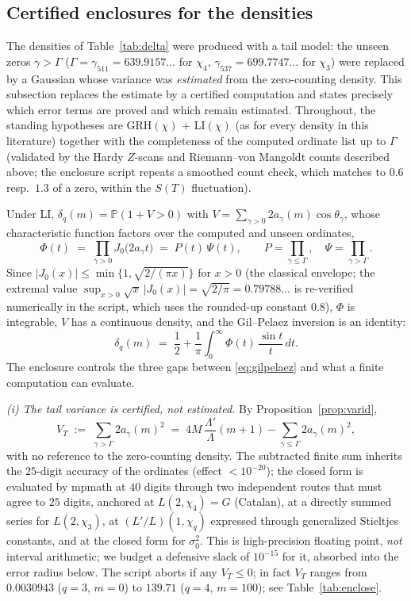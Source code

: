 \subsection*{Certified enclosures for the densities}
\label{subsec:certified}

The densities of Table~\ref{tab:delta} were produced with a tail model:
the unseen zeros $\gamma>\Gamma$ ($\Gamma=\gamma_{511}=639.9157\ldots$
for $\chi_4$, $\gamma_{537}=699.7747\ldots$ for $\chi_3$) were replaced
by a Gaussian whose variance was \emph{estimated} from the
zero-counting density. This subsection replaces the estimate by a
certified computation and states precisely which error terms are proved
and which remain estimated. Throughout, the standing hypotheses are
GRH$(\chi)$ + LI$(\chi)$ (as for every density in this literature)
together with the completeness of the computed ordinate list up to
$\Gamma$ (validated by the Hardy $Z$-scans and Riemann--von Mangoldt
counts described above; the enclosure script repeats a smoothed count
check, which matches to $0.6$ resp.\ $1.3$ of a zero, within the
$S(T)$ fluctuation).

Under LI, $\delta_q(m)=\mathbb P(1+V>0)$ with
$V=\sum_{\gamma>0}2a_\gamma(m)\cos\theta_\gamma$, whose characteristic
function factors over the computed and unseen ordinates,
\[
\Phi(t)\;=\;\prod_{\gamma>0}J_0\bigl(2a_\gamma t\bigr)
\;=\;P(t)\,\Psi(t),\qquad
P=\prod_{\gamma\le\Gamma},\quad \Psi=\prod_{\gamma>\Gamma}.
\]
Since $|J_0(x)|\le\min\{1,\sqrt{2/(\pi x)}\}$ for $x>0$ (the classical
envelope; the extremal value $\sup_{x>0}\sqrt x\,|J_0(x)|=\sqrt{2/\pi}
=0.79788\ldots$ is re-verified numerically in the script, which uses
the rounded-up constant $0.8$), $\Phi$ is integrable, $V$ has a
continuous density, and the Gil--Pelaez inversion is an identity:
\begin{equation}\label{eq:gilpelaez}
\delta_q(m)\;=\;\frac12+\frac1\pi\int_0^\infty
\Phi(t)\,\frac{\sin t}{t}\,dt .
\end{equation}
The enclosure controls the three gaps between \eqref{eq:gilpelaez} and
what a finite computation can evaluate.

\emph{(i) The tail variance is certified, not estimated.} By
Proposition~\ref{prop:varid},
\[
V_T\;:=\;\sum_{\gamma>\Gamma}2a_\gamma(m)^2
\;=\;4M\,\frac{\Lambda'}{\Lambda}(m+1)-\sum_{\gamma\le\Gamma}2a_\gamma(m)^2 ,
\]
with no reference to the zero-counting density. The subtracted finite
sum inherits the $25$-digit accuracy of the ordinates (effect
$<10^{-20}$); the closed form is evaluated by mpmath at $40$ digits
through two independent routes that must agree to $25$ digits, anchored
at $L(2,\chi_4)=G$ (Catalan), at a directly summed series for
$L(2,\chi_3)$, at $(L'/L)(1,\chi_q)$ expressed through generalized
Stieltjes constants, and at the closed form for $\sigma_0^2$. This is
high-precision floating point, \emph{not} interval arithmetic; we
budget a defensive slack of $10^{-15}$ for it, absorbed into the error
radius below. The script aborts if any $V_T\le0$; in fact
$V_T$ ranges from $0.0030943$ ($q=3$, $m=0$) to $139.71$
($q=4$, $m=100$); see Table~\ref{tab:enclose}.

